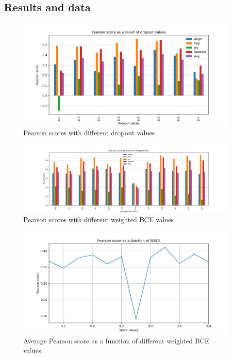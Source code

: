 \subsection{Results and data}
\begin{figure}[H]
    \centering
        \includegraphics[width=\textwidth]{pictures/dropoutvalues.png}
        \caption{Pearson scores with different dropout values}
        \label{fig:dropoutvalues}
\end{figure}
\begin{figure}[H]
    \centering
        \includegraphics[width=\textwidth]{pictures/weightedBCEvalues.png}
        \caption{Pearson scores with different weighted BCE values}
        \label{fig:weightedBCEvalues}
\end{figure}
\begin{figure}[H]
    \centering
        \includegraphics[width=\textwidth]{pictures/weightedBCEplot.png}
        \caption{Average Pearson score as a function of different weighted BCE values}
        \label{fig:weightedBCEplot}
\end{figure}


